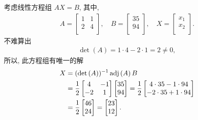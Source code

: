 \documentclass[../libro.tex]{subfiles}
\begin{document}
\begin{example}
    考虑线性方程组 \(AX = B\),
    其中,
    \begin{align*}
        A =
        \begin{bmatrix}
            1 & 1 \\
            2 & 4 \\
        \end{bmatrix},
        \quad
        B =
        \begin{bmatrix}
            35 \\
            94 \\
        \end{bmatrix},
        \quad
        X =
        \begin{bmatrix}
            x_1 \\
            x_2 \\
        \end{bmatrix}.
    \end{align*}
    不难算出
    \begin{align*}
        \det {(A)} = 1 \cdot 4 - 2 \cdot 1 = 2 \neq 0,
    \end{align*}
    所以, 此方程组有唯一的解
    \begin{align*}
        X
        = {} &
        (\det {(A)})^{-1} \operatorname{adj} {(A)}\,B
        \\
        = {} &
        \frac{1}{2}
        \begin{bmatrix}
            4  & -1 \\
            -2 & 1  \\
        \end{bmatrix}
        \begin{bmatrix}
            35 \\
            94 \\
        \end{bmatrix}
        =
        \frac{1}{2}
        \begin{bmatrix}
            4 \cdot 35 - 1 \cdot 94  \\
            -2 \cdot 35 + 1 \cdot 94 \\
        \end{bmatrix}
        \\
        = {} &
        \frac{1}{2}
        \begin{bmatrix}
            46 \\
            24 \\
        \end{bmatrix}
        =
        \begin{bmatrix}
            23 \\
            12 \\
        \end{bmatrix}.
        \qedhere
    \end{align*}
\end{example}
\end{document}

